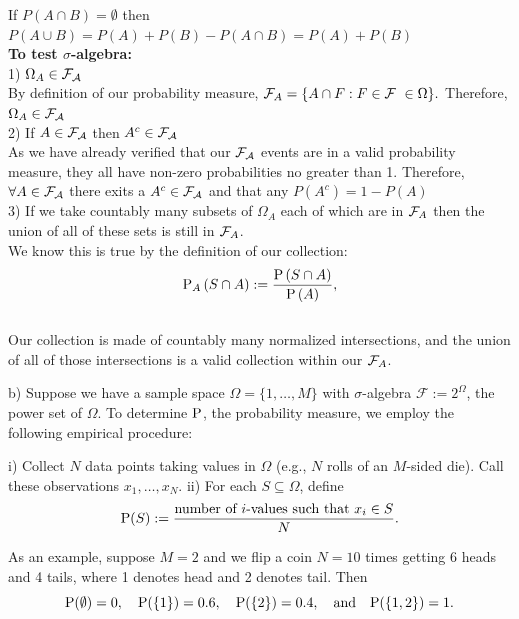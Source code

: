 \documentclass[12pt,twoside]{article}
\begin{document}
\begin{enumerate}
If $P(A\cap B) = \emptyset$ then $P(A\cup B) = P(A)+P(B)-P(A\cap B) = P(A) + P(B)$ \\

\textbf{To test $\sigma$-algebra:} \\
1) $\Omega _A \in \ml{F_A}$ \\

By definition of our probability measure, $\ml{F}_{A} = \{A\cap F : F \in \ml{F}\ \in \Omega \}.$ Therefore, $\Omega _A \in \ml{F_A}$ \\

2) If $A \in \ml{F_A}$ then $A^c \in \ml{F_A}$ \\

As we have already verified that our $\ml{F_A}$ events are in a valid probability measure, they all have non-zero probabilities no greater than 1. Therefore, $\forall A \in \ml{F_A}$ there exits a  $A^c \in \ml{F_A}$ and that any $P(A^c) = 1-P(A)$ \\

3) If we take countably many subsets of $\Omega _A$ each of which are in $\ml{F}_A$ then the union of all of these sets is still in $\ml{F}_A$. \\

We know this is true by the definition of our collection:
$$
\P_{A}\brac{S\cap A} :=  \frac{ \P \brac{ S \cap A} }{ \P\brac{A} },
$$ \\

Our collection is made of countably many normalized intersections, and the union of all of those intersections is a valid collection within our $\ml{F}_A$. \\


\break



b) Suppose we have a sample space $\Omega=\{1,\ldots,M\}$ with
  $\sigma$-algebra $\mathcal{F}:=2^\Omega$, the power set of $\Omega$.
  To determine $\P$, the probability measure, we employ the following
  empirical procedure:

 i) Collect $N$ data points taking values in $\Omega$ (e.g., $N$ rolls
    of an $M$-sided die).  Call these observations
    $x_1,\ldots,x_N$.
 ii) For each $S\subseteq\Omega$, define
    $$\P(S) := \frac{\text{number of $i$-values such that $x_i\in S$}}{N}.$$

  As an example, suppose $M=2$ and we flip a coin $N=10$ times getting
  6 heads and 4 tails, where 1 denotes head and 2 denotes tail.  Then
  $$\P(\emptyset)=0,\quad \P(\{1\})=0.6,\quad \P(\{2\})=0.4,\quad\text{and}\quad \P(\{1,2\})=1.$$
  

\end{enumerate}
\end{document}
